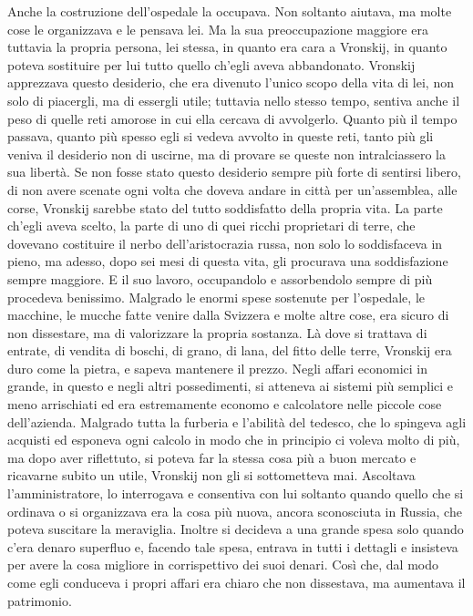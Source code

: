 Anche la costruzione dell'ospedale la occupava. Non soltanto aiutava, ma molte cose le organizzava e le pensava lei. Ma la sua preoccupazione maggiore era tuttavia la propria persona, lei stessa, in quanto era cara a Vronskij, in quanto poteva sostituire per lui tutto quello ch'egli aveva abbandonato. Vronskij apprezzava questo desiderio, che era divenuto l'unico scopo della vita di lei, non solo di piacergli, ma di essergli utile; tuttavia nello stesso tempo, sentiva anche il peso di quelle reti amorose in cui ella cercava di avvolgerlo. Quanto più il tempo passava, quanto più spesso egli si vedeva avvolto in queste reti, tanto più gli veniva il desiderio non di uscirne, ma di provare se queste non intralciassero la sua libertà. Se non fosse stato questo desiderio sempre più forte di sentirsi libero, di non avere scenate ogni volta che doveva andare in città per un'assemblea, alle corse, Vronskij sarebbe stato del tutto soddisfatto della propria vita. La parte ch'egli aveva scelto, la parte di uno di quei ricchi proprietari di terre, che dovevano costituire il nerbo dell'aristocrazia russa, non solo lo soddisfaceva in pieno, ma adesso, dopo sei mesi di questa vita, gli procurava una soddisfazione sempre maggiore. E il suo lavoro, occupandolo e assorbendolo sempre di più procedeva benissimo. Malgrado le enormi spese sostenute per l'ospedale, le macchine, le mucche fatte venire dalla Svizzera e molte altre cose, era sicuro di non dissestare, ma di valorizzare la propria sostanza. Là dove si trattava di entrate, di vendita di boschi, di grano, di lana, del fitto delle terre, Vronskij era duro come la pietra, e sapeva mantenere il prezzo. Negli affari economici in grande, in questo e negli altri possedimenti, si atteneva ai sistemi più semplici e meno arrischiati ed era estremamente economo e calcolatore nelle piccole cose dell'azienda. Malgrado tutta la furberia e l'abilità del tedesco, che lo spingeva agli acquisti ed esponeva ogni calcolo in modo che in principio ci voleva molto di più, ma dopo aver riflettuto, si poteva far la stessa cosa più a buon mercato e ricavarne subito un utile, Vronskij non gli si sottometteva mai. Ascoltava l'amministratore, lo interrogava e consentiva con lui soltanto quando quello che si ordinava o si organizzava era la cosa più nuova, ancora sconosciuta in Russia, che poteva suscitare la meraviglia. Inoltre si decideva a una grande spesa solo quando c'era denaro superfluo e, facendo tale spesa, entrava in tutti i dettagli e insisteva per avere la cosa migliore in corrispettivo dei suoi denari. Così che, dal modo come egli conduceva i propri affari era chiaro che non dissestava, ma aumentava il patrimonio. 

